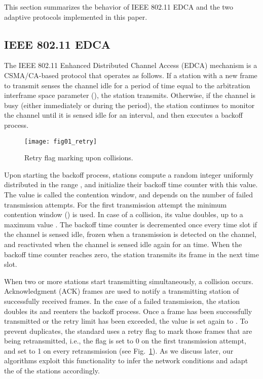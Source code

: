 \documentclass[a4paper,10pt]{article}
\newcommand{\revs}[1]{\textcolor{black}{#1}}
\begin{document}
This section summarizes the behavior of IEEE 802.11 EDCA \revs{\cite{80211revised}} and the two adaptive protocols implemented in this paper. 

\subsection{IEEE 802.11 EDCA}

The IEEE 802.11 Enhanced Distributed Channel Access (EDCA) mechanism \revs{\cite{80211revised}} is a CSMA/CA-based protocol that operates as follows. If a station with a new frame to transmit senses the channel idle for a period of time equal to the arbitration interframe space parameter (), the station transmits. Otherwise, if the channel is busy (either immediately or during the  period), the station continues to monitor the channel until it is sensed idle for an  interval, and then executes a backoff process.

\begin{figure}
\centerline{\texttt{[image: fig01\_retry]}}
\caption{Retry flag marking upon collisions.}
\label{fig:retry}
\end{figure}

Upon starting the backoff process, stations compute a random integer uniformly distributed in the range , and initialize their backoff time counter with this value. The  value is called the contention window, and depends on the number of failed transmission attempts. For the first transmission attempt the minimum contention window () is used. In case of a collision, its value doubles, up to a maximum value . The backoff time counter is decremented once every time slot if the channel is sensed idle, frozen when a transmission is detected on the channel, and reactivated when the channel is sensed idle again for an  time. When the backoff time counter reaches zero, the station transmits its frame in the next time slot. 

When two or more stations start transmitting simultaneously, a collision occurs. Acknowledgment (ACK) frames are used to notify a transmitting station of successfully received frames. In the case of a failed transmission, the station doubles its  and reenters the backoff process. Once a frame has been successfully transmitted or the retry limit has been exceeded, the  value is set again to . To prevent duplicates, the standard uses a retry flag  to mark those frames that are being retransmitted, i.e., the flag is set to 0 on the first transmission attempt, and set to 1 on every retransmission (see Fig.~\ref{fig:retry}). As we discuss later, our algorithms exploit this functionality to infer the network conditions and adapt the  of the stations accordingly. 
\end{document}
